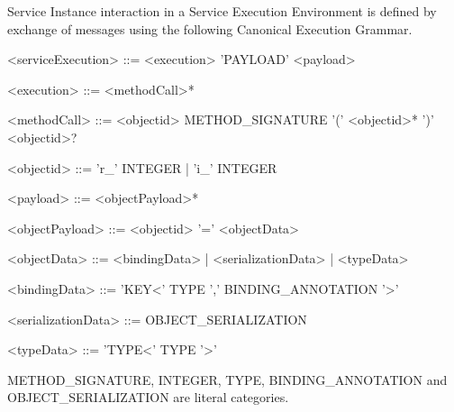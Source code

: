 Service Instance interaction in a Service Execution Environment is defined by exchange of messages using the following Canonical Execution Grammar.

\begin{defi}
\end{defi}
\begin{grammar}
<serviceExecution> ::= <execution> 'PAYLOAD' <payload>

<execution> ::= <methodCall>*

<methodCall> ::= <objectid> METHOD_SIGNATURE '(' <objectid>* ')' <objectid>? 

<objectid> ::= 'r_' INTEGER | 'i_' INTEGER

<payload> ::= <objectPayload>*

<objectPayload> ::= <objectid> '=' <objectData>

<objectData> ::= <bindingData> | <serializationData> | <typeData>

<bindingData> ::= 'KEY<' TYPE ',' BINDING_ANNOTATION '>' 

<serializationData> ::= OBJECT_SERIALIZATION

<typeData> ::= 'TYPE<' TYPE '>'
\end{grammar}
METHOD_SIGNATURE, INTEGER, TYPE, BINDING_ANNOTATION and OBJECT_SERIALIZATION are literal categories.


